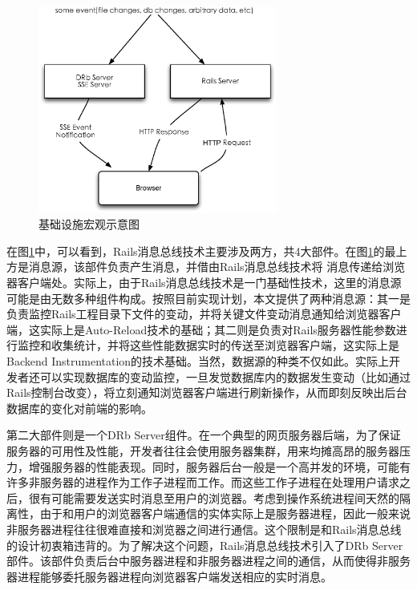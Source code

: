 \begin{figure}[h]
\centering
\includegraphics[width=0.7\textwidth]{images/overview/infrastructure.eps}
\caption{基础设施宏观示意图}
\label{fig-infra}
\end{figure}

在图\ref{fig-infra}中，可以看到，Rails消息总线技术主要涉及两方，共4大部件。在图\ref{fig-infra}的最上方是消息源，该部件负责产生消息，并借由Rails消息总线技术将 消息传递给浏览器客户端处。实际上，由于Rails消息总线技术是一门基础性技术，这里的消息源可能是由无数多种组件构成。按照目前实现计划，本文提供了两种消息源：其一是负责监控Rails工程目录下文件的变动，并将关键文件变动消息通知给浏览器客户端，这实际上是Auto-Reload技术的基础；其二则是负责对Rails服务器性能参数进行监控和收集统计，并将这些性能数据实时的传送至浏览器客户端，这实际上是Backend Instrumentation的技术基础。当然，数据源的种类不仅如此。实际上开发者还可以实现数据库的变动监控，一旦发觉数据库内的数据发生变动（比如通过Rails控制台改变），将立刻通知浏览器客户端进行刷新操作，从而即刻反映出后台数据库的变化对前端的影响。

第二大部件则是一个DRb Server组件。在一个典型的网页服务器后端，为了保证服务器的可用性及性能，开发者往往会使用服务器集群，用来均摊高昂的服务器压力，增强服务器的性能表现。同时，服务器后台一般是一个高并发的环境，可能有许多非服务器的进程作为工作子进程而工作。而这些工作子进程在处理用户请求之后，很有可能需要发送实时消息至用户的浏览器。考虑到操作系统进程间天然的隔离性，由于和用户的浏览器客户端通信的实体实际上是服务器进程，因此一般来说非服务器进程往往很难直接和浏览器之间进行通信。这个限制是和Rails消息总线的设计初衷箱违背的。为了解决这个问题，Rails消息总线技术引入了DRb Server部件。该部件负责后台中服务器进程和非服务器进程之间的通信，从而使得非服务器进程能够委托服务器进程向浏览器客户端发送相应的实时消息。

